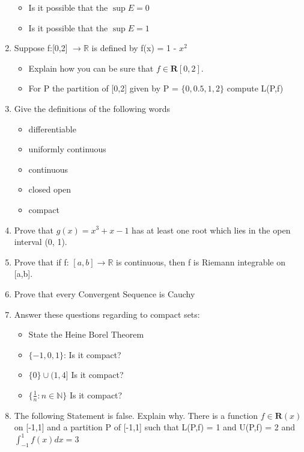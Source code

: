 \documentclass[12pt]{article}
\begin{document}
\begin{enumerate}
    \begin{itemize}
        \item Is it possible that the $\sup E = 0$
        \item Is it possible that the $\sup E = 1$
    \end{itemize}
    \item Suppose f:[0,2] $\to \mathbb{R}$ is defined by f(x) = 1 - $x^2$
    \begin{itemize}
        \item Explain how you can be sure that $f \in \mathbf{R}[0,2]$.
        \item For P the partition of [0,2] given by P = $\{0,0.5,1,2\}$ compute L(P,f)
    \end{itemize}
    \item Give the definitions of the following words 
    \begin{itemize}
        \item differentiable 
        \item uniformly continuous
        \item continuous 
        \item closed 
        \itme open 
        \item compact 
    \end{itemize}
    \item Prove that $g(x) = x
^3 + x - 1$ has at least one root which lies in the open interval
(0, 1).
    \item Prove that if f: $[a,b] \to \mathbb{R}$ is continuous, then f is Riemann integrable on [a,b]. 
    \item Prove that every Convergent Sequence is Cauchy 
    \item Answer these questions regarding to compact sets:
    \begin{itemize}
        \item State the Heine Borel Theorem 
        \item $\{-1,0,1\}$: Is it compact?
        \item $\{0\} \cup (1,4]$ Is it compact?
        \item $\{ \frac{1}{n}: n \in \mathbb{N}\}$ Is it compact?
    \end{itemize}
    \item The following Statement is false. Explain why. \newline 
    There is a function $f \in \mathbf{R}(x)$ on [-1,1] and a partition P of [-1,1] such that L(P,f) = 1 and U(P,f) = 2 and $\int_{-1}^{1} f(x) dx = 3$

\end{enumerate}
\end{document}
